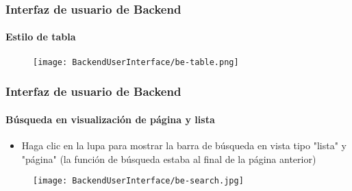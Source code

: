 
\begin{frame}[fragile]
	\frametitle{Interfaz de usuario de Backend}
	\framesubtitle{Estilo de tabla}

	\begin{figure}
		\texttt{[image: BackendUserInterface/be-table.png]}
	\end{figure}

\end{frame}


\begin{frame}[fragile]
	\frametitle{Interfaz de usuario de Backend}
	\framesubtitle{Búsqueda en visualización de página y lista}

	\begin{itemize}
		\item Haga clic en la lupa para mostrar la barra de búsqueda en vista tipo "lista" y "página"
			(la función de búsqueda estaba al final de la página anterior)
	\end{itemize}

	\begin{figure}
		\texttt{[image: BackendUserInterface/be-search.jpg]}
	\end{figure}

\end{frame}



